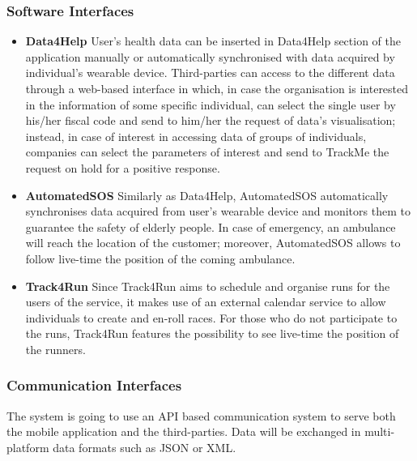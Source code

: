 \documentclass{article}
\begin{document}
	\subsubsection{Software Interfaces}
	\begin{itemize}
		\item \textbf{Data4Help} \newline 
		User's health data can be inserted in Data4Help section of the
		application manually or automatically synchronised with data
		acquired by individual's wearable device. \newline
		Third-parties can access to the different data through a 
		web-based interface in which, in case the organisation is 
		interested in the information of some specific individual, 
		can select the single user by his/her fiscal code and send to
		him/her the request of data's visualisation; instead, in 
		case of interest in accessing data of groups of individuals, 
		companies can select the parameters of interest and send to 
		TrackMe the request on hold for a positive response.
		\item \textbf{AutomatedSOS} \newline
		Similarly as Data4Help, AutomatedSOS automatically 
		synchronises data acquired from user's wearable device and 
		monitors them to guarantee the safety of elderly people. 
		\newline
		In case of emergency, an ambulance will reach the location
		of the customer; moreover, AutomatedSOS allows to follow 
		live-time the position of the coming ambulance. 
		\item \textbf{Track4Run} \newline
		Since Track4Run aims to schedule and organise runs for the 
		users of the service, it makes use of an external calendar
		service to allow individuals to create and en-roll races. 
		\newline
		For those who do not participate to the runs, Track4Run 
		features the possibility to see live-time the position of
		the runners.
	\end{itemize} 
	
	\subsubsection{Communication Interfaces}
	The system is going to use an API based communication system to 
	serve both the mobile application and the third-parties. \newline
	Data will be exchanged in multi-platform data formats such as 
	JSON or XML.
		
\end{document}
